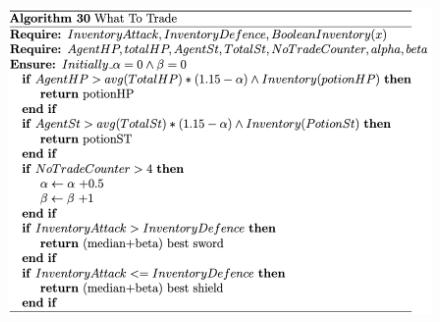 

\begin{figure}[htb]
    \centering
    \includegraphics[scale=0.7]{006_team_3_agent_design/FIGS/Algo30.png}
    \label{fig:algo30}
\end{figure}



